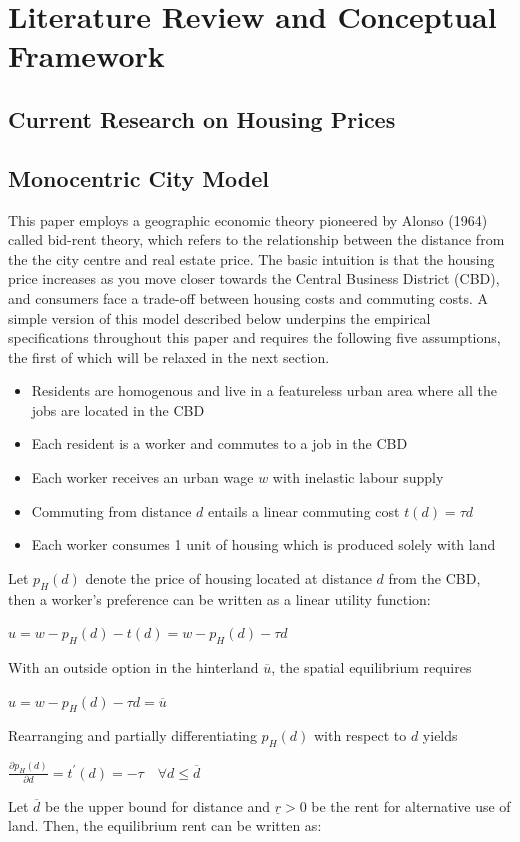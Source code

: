 \documentclass{article}
\begin{document}
\section{Literature Review and Conceptual Framework}
\subsection{Current Research on Housing Prices}
\subsection{Monocentric City Model}
This paper employs a geographic economic theory pioneered by Alonso (1964) called bid-rent theory, which refers to the relationship between the distance from the the city centre and real estate price. The basic intuition is that the housing price increases as you move closer towards the Central Business District (CBD), and consumers face a trade-off between housing costs and commuting costs. A simple version of this model described below underpins the empirical specifications throughout this paper and requires the following five assumptions, the first of which will be relaxed in the next section.
\begin{itemize}
\setlength\itemsep{0.1em}
\item Residents are homogenous and live in a featureless urban area where all the jobs are located in the CBD
\item Each resident is a worker and commutes to a job in the CBD
\item Each worker receives an urban wage $w$ with inelastic labour supply
\item Commuting from distance $d$ entails a linear commuting cost $t(d) = \tau d$
\item Each worker consumes 1 unit of housing which is produced solely  with land
\end{itemize}
Let $p_H (d)$ denote the price of housing located at distance $d$ from the CBD, then a worker's preference can be written as a linear utility function:
\begin{center}
$u = w - p _ { H } ( d ) - t ( d ) = w - p _ { H } ( d ) - \tau d$
\end{center}
With an outside option in the hinterland $\overline{u}$, the spatial equilibrium requires
\begin{center}
$u = w - p _ { H } ( d ) - \tau d = \overline { u }$
\end{center}
Rearranging and partially differentiating $p_H (d)$ with respect to $d$ yields 
\begin{center}
$\frac { \partial p _ { H } ( d ) } { \partial d } = t ^ { \prime } ( d ) = - \tau \quad \forall d \leq \overline { d }$
\end{center}
Let $\overline{d}$ be the upper bound for distance and $\underline{r} > 0$ be the rent for alternative use of land. Then, the equilibrium rent can be written as:
\end{document}
